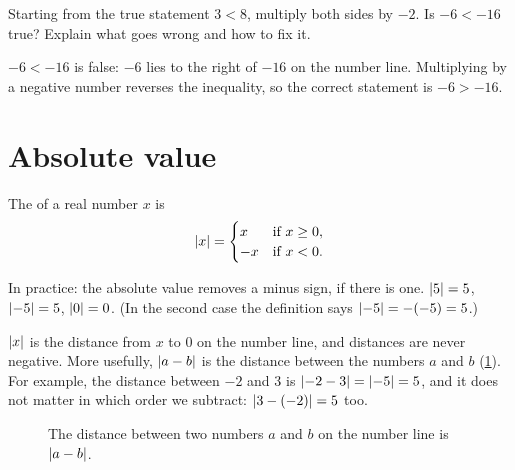 \begin{exercise}
Starting from the true statement $3 < 8$, multiply both sides by $-2$. Is
$-6 < -16$ true? Explain what goes wrong and how to fix it.
\end{exercise}
\begin{solution}
$-6 < -16$ is false: $-6$ lies to the right of $-16$ on the number line.
Multiplying by a negative number reverses the inequality, so the correct
statement is $-6 > -16$.
\end{solution}

\section{Absolute value}\label{sec:absolute-value}

\begin{definition}\label{def:absolute-value}
The  of a real number $x$ is
\[
  \lvert x\rvert = \begin{cases}
    x & \text{if } x \ge 0,\\
    -x & \text{if } x < 0.
  \end{cases}
\]
\end{definition}

In practice: the absolute value removes a minus sign, if there is one.
$\lvert5\rvert = 5$, $\lvert-5\rvert = 5$, $\lvert0\rvert = 0$. (In the second case the
definition says $\lvert-5\rvert = -(-5) = 5$.)

\begin{intuition}
$\lvert x\rvert$ is the distance from $x$ to $0$ on the number line, and distances are
never negative. More usefully, $\lvert a - b\rvert$ is the distance between the
numbers $a$ and $b$ (\cref{fig:abs-distance}). For example, the distance
between $-2$ and $3$ is $\lvert-2 - 3\rvert = \lvert-5\rvert = 5$, and it does not matter
in which order we subtract: $\lvert3 - (-2)\rvert = 5$ too.
\end{intuition}

\begin{figure}[htbp]
\centering
{}
\caption{The distance between two numbers $a$ and $b$ on the number line is
  $\lvert a-b\rvert$.}
\label{fig:abs-distance}
\end{figure}

